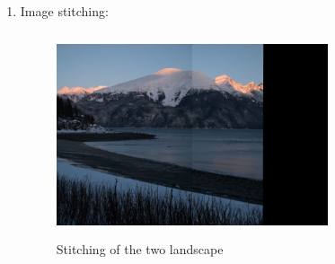 \documentclass[12pt]{article}
\begin{document}
\begin{enumerate}[label=(\alph*)]
 \item Image stitching:
   \begin{figure}[ht]
     \centering
     \includegraphics[width=8cm, height=6cm]{./panorama.png}
     \caption{Stitching of the two landscape}
     \label{img:stitching}
   \end{figure}

\end{enumerate}
\end{document}
